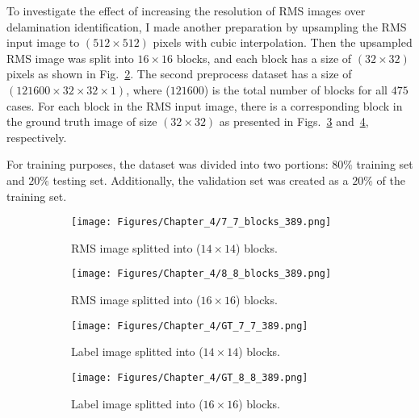 To investigate the effect of increasing the resolution of RMS images over delamination identification, I made another preparation by upsampling the RMS input image to \((512\times 512)\) pixels with cubic interpolation. Then the upsampled RMS image was split into \(16\times 16\) blocks, and each block has a size of \((32\times 32)\) pixels as shown in Fig.~\ref{fig:RMS_64blocks}.
The second preprocess dataset has a size of \((121600 \times 32 \times 32 \times 1)\), where (\(121600\)) is the total number of blocks for all \(475\) cases.
For each block in the RMS input image, there is a corresponding block in the ground truth image of size \((32\times 32)\) as presented in Figs.~\ref{fig:GT_49blocks} and~\ref{fig:GT_64blocks}, respectively.

For training purposes, the dataset was divided into two portions: \(80\%\)	training set and \(20\%\) testing set. 
Additionally, the validation set was created as a \(20\%\) of the training set.
\begin{figure} [h!]
	\centering
	\begin{subfigure}[b]{0.47\textwidth}
		\centering
		\texttt{[image: Figures/Chapter\_4/7\_7\_blocks\_389.png]}
		\caption{RMS image splitted into (\(14\times 14\)) blocks.}
		\label{fig:RMS_49blocks}
	\end{subfigure}
	\hfill
	\begin{subfigure}[b]{0.47\textwidth}
		\centering
		\texttt{[image: Figures/Chapter\_4/8\_8\_blocks\_389.png]}
		\caption{RMS image splitted into (\(16\times 16\)) blocks.}
		\label{fig:RMS_64blocks}
	\end{subfigure}
	\hfill
	\begin{subfigure}[b]{0.47\textwidth}
		\centering
		\texttt{[image: Figures/Chapter\_4/GT\_7\_7\_389.png]}
		\caption{Label image splitted into (\(14\times 14\)) blocks.}
		\label{fig:GT_49blocks}
	\end{subfigure}
	\hfill
	\begin{subfigure}[b]{0.47\textwidth}
		\centering
		\texttt{[image: Figures/Chapter\_4/GT\_8\_8\_389.png]}
		\caption{Label image splitted into (\(16\times 16\)) blocks.}
		\label{fig:GT_64blocks}
	\end{subfigure}
	\caption{}
	\label{fig:grid_mesh}
\end{figure}

